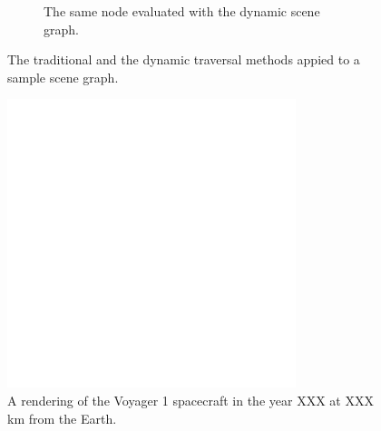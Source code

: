 \begin{figure}
\begin{subfigure}[b]{0.4\textwidth}
    \caption{The same node evaluated with the dynamic scene graph.}
    \label{contributions:astro:dsg:sceengraph:dsg}
\end{subfigure}
\caption{The traditional and the dynamic traversal methods appied to a sample scene graph.}
\label{contributions:astro:dsg:sceengraph}
\end{figure}

\begin{figure}
\centering
\includegraphics[width=0.75\textwidth]{figures/empty.png}
\caption{A rendering of the Voyager 1 spacecraft in the year XXX at XXX\, km from the Earth.}
\label{contributions:astro:dsg:voyager}
\end{figure}

